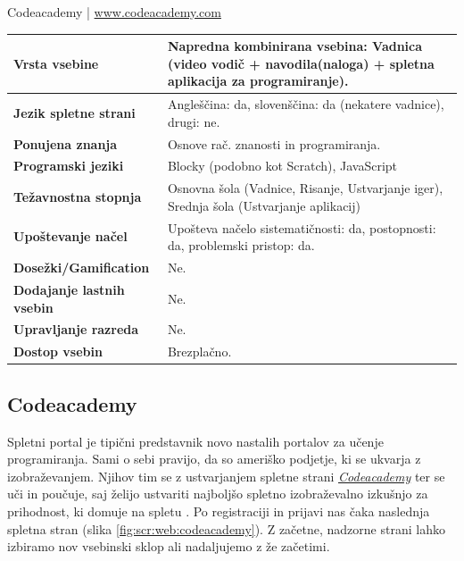 \begin{osebnabox}[label={osebna:codeacademy}]{Codeacademy | \url{www.codeacademy.com}}
    \begin{tabular}{
  p{} |
  p{}  }
  \textbf{Vrsta vsebine} & Napredna kombinirana vsebina: Vadnica
                           (video vodič + navodila(naloga) + spletna
                           aplikacija za programiranje). \\
      \hline 
  \textbf{Jezik spletne strani} &  Angleščina: da, slovenščina: da
                                  (nekatere vadnice),
                                  drugi: ne. \\
      \hline
  \textbf{Ponujena znanja} & Osnove rač. znanosti in programiranja. \\
      \hline
  \textbf{Programski jeziki} & Blocky (podobno kot Scratch),
                               JavaScript \\
      \hline
  \textbf{Težavnostna stopnja} & Osnovna šola (Vadnice, Risanje,
                                 Ustvarjanje iger), Srednja šola
                                 (Ustvarjanje aplikacij) \\
      \hline
  \textbf{Upoštevanje načel} & Upošteva načelo sistematičnosti: da,
      postopnosti: da, problemski pristop: da. \\
      \hline
  \textbf{Dosežki/Gamification} & Ne. \\
      \hline
  \textbf{Dodajanje lastnih vsebin} & Ne. \\
      \hline
  \textbf{Upravljanje razreda} & Ne. \\
      \hline
  \textbf{Dostop vsebin} & Brezplačno. \\
\end{tabular}
\end{osebnabox}

\subsection{Codeacademy}

Spletni portal je tipični predstavnik novo nastalih portalov za učenje
programiranja. Sami o sebi pravijo, da so ameriško podjetje, ki se
ukvarja z izobraževanjem. Njihov tim se z ustvarjanjem spletne strani
\emph{\href{https://www.codecademy.com/}{Codeacademy}} ter se uči in
poučuje, saj želijo ustvariti najboljšo spletno izobraževalno izkušnjo
za prihodnost, ki domuje na spletu \cite{web:codeacademy}. Po
registraciji in prijavi nas čaka naslednja spletna stran (slika
\ref{fig:scr:web:codeacademy}). Z začetne, nadzorne strani lahko
izbiramo nov vsebinski sklop ali nadaljujemo z že začetimi.

